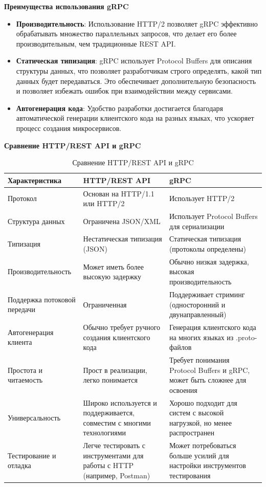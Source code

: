 \textbf{Преимущества использования gRPC}
\begin{itemize}
    \item \textbf{Производительность}: Использование HTTP/2 позволяет gRPC эффективно обрабатывать множество параллельных запросов, что делает его более производительным, чем традиционные REST API.
    \item \textbf{Статическая типизация}: gRPC использует Protocol Buffers для описания структуры данных, что позволяет разработчикам строго определять, какой тип данных будет передаваться. Это обеспечивает дополнительную безопасность и позволяет избежать ошибок при взаимодействии между сервисами.
    \item \textbf{Автогенерация кода}: Удобство разработки достигается благодаря автоматической генерации клиентского кода на разных языках, что ускоряет процесс создания микросервисов.
\end{itemize}


\textbf{Сравнение HTTP/REST API и gRPC}
\begin{table}[h]
    \centering
    \begin{tabular}{|l|l|l|}
        \hline
        \textbf{Характеристика}           & \textbf{HTTP/REST API}                          & \textbf{gRPC}                                     \\ \hline
        Протокол                  & Основан на HTTP/1.1 или HTTP/2            & Использует HTTP/2                             \\ \hline
        Структура данных          & Ограничена JSON/XML                        & Использует Protocol Buffers для сериализации \\ \hline
        Типизация                 & Нестатическая типизация (JSON)            & Статическая типизация (протоколы определены) \\ \hline
        Производительность         & Может иметь более высокую задержку         & Обычно низкая задержка, высокая производительность \\ \hline
        Поддержка потоковой передачи & Ограниченная                                & Поддерживает стриминг (односторонний и двунаправленный) \\ \hline
        Автогенерация клиента     & Обычно требует ручного создания клиентского кода & Генерация клиентского кода на многих языках из .proto-файлов \\ \hline
        Простота и читаемость     & Прост в реализации, легко понимается      & Требует понимания Protocol Buffers и gRPC, может быть сложнее для освоения \\ \hline
        Универсальность           & Широко используется и поддерживается, совместим с многими технологиями & Хорошо подходит для систем с высокой нагрузкой, но менее распространен \\ \hline
        Тестирование и отладка   & Легче тестировать с инструментами для работы с HTTP (например, Postman) & Может потребоваться больше усилий для настройки инструментов тестирования \\ \hline
    \end{tabular}
    \caption{Сравнение HTTP/REST API и gRPC}
\end{table}


